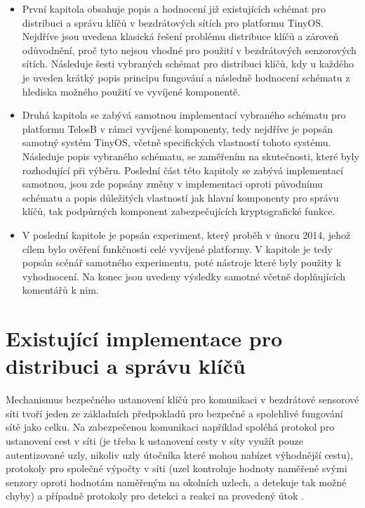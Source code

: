 \documentclass[11pt,final,twoside]{fithesis2}
\begin{document}
\begin {itemize}
\item První kapitola obsahuje popis a hodnocení již existujících schémat pro distribuci a správu klíčů v bezdrátových sítích pro platformu TinyOS. Nejdříve jsou uvedena klasická řešení problému distribuce 
klíčů a zároveň odůvodnění, proč tyto nejsou vhodné pro použití v bezdrátových senzorových sítích. Následuje šesti vybraných schémat pro distribuci klíčů, kdy u každého je uveden krátký popis principu 
fungování a následně hodnocení schématu z hlediska možného použití ve vyvíjené komponentě. 

\item Druhá kapitola se zabývá samotnou implementací vybraného schématu pro platformu TelosB v rámci vyvíjené komponenty, tedy nejdříve je popsán samotný systém TinyOS, včetně specifických vlastností tohoto 
systému. Následuje popis vybraného schématu, se zaměřením na skutečnosti, které byly rozhodující při výběru. Poslední část této kapitoly se zabývá implementací samotnou, jsou zde popsány změny v implementaci 
oproti původnímu schématu a popis důležitých vlastností jak hlavní komponenty pro správu klíčů, tak podpůrných komponent zabezpečujících kryptografické funkce. 

\item V poslední kapitole je popsán experiment, který proběh v únoru 2014, jehož cílem bylo ověření funkčnosti celé vyvíjené platformy. V kapitole je tedy popsán scénář samotného experimentu, poté nástroje 
které byly použity k vyhodnocení. Na konec jsou uvedeny výsledky samotné včetně doplňujících komentářů k nim. 
\end{itemize}



\chapter{Existující implementace pro distribuci a správu klíčů}
Mechanismus bezpečného ustanovení klíčů pro komunikaci v bezdrátové sensorové síti tvoří jeden ze základních předpokladů 
pro bezpečné a spolehlivé fungování sítě jako celku. Na zabezpečenou komunikaci například spoléhá protokol pro ustanovení cest v síti (je třeba k ustanovení cesty v síty využít
pouze autentizované uzly, nikoliv uzly útočníka které mohou nabízet výhodnější cestu), protokoly pro společné výpočty v síti (uzel kontroluje hodnoty naměřené svými senzory oproti
hodnotám naměřeným na okolních uzlech, a detekuje tak možné chyby) a případně protokoly pro detekci a reakci na provedený útok \cite{Alcaraz2012}.
\end{document}

